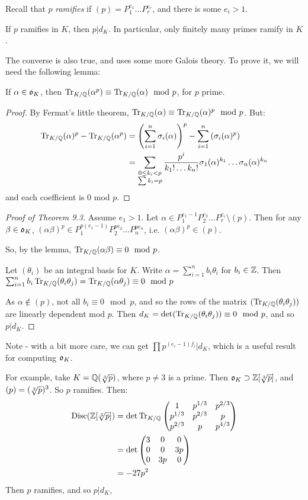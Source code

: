 \documentclass[10pt,a4paper]{article}
\begin{document}
Recall that $p$ \emph{ramifies} if $(p) = P_1^{e_1} \ldots P_r^{e_r}$, and there is some $e_i > 1$.
\begin{theorem}
If $p$ ramifies in $K$, then $p | d_K$. In particular, only finitely many primes ramify in $K$.
\end{theorem}
The converse is also true, and uses some more Galois theory. To prove it, we will need the following lemma:
\begin{lemma}
If $\alpha \in \mathfrak{o}_K$, then $\operatorname{Tr}_{K/\mathbb{Q}}(\alpha^p) \equiv \operatorname{Tr}_{K/\mathbb{Q}}(\alpha)\mod p$, for $p$ prime.
\end{lemma}
\begin{proof}
By Fermat's little theorem, $\operatorname{Tr}_{K/\mathbb{Q}}(\alpha) \equiv \operatorname{Tr}_{K/\mathbb{Q}}(\alpha)^p \mod p$. But:
\begin{align*}
\operatorname{Tr}_{K/\mathbb{Q}}(\alpha)^p - \operatorname{Tr}_{K/\mathbb{Q}}(\alpha^p) &= \left(\sum_{i=1}^n \sigma_i(\alpha)\right)^p - \sum_{i=1}^n \left(\sigma_i(\alpha)^p\right)\\
&= \sum_{\substack{0\leq k_i <p\\\sum k_i = p}} \frac{p^i}{k_1!\ldots k_n!}\sigma_1(\alpha)^{k_1}\ldots \sigma_n(\alpha)^{k_n}
\end{align*}
and each coefficient is $0$ mod $p$.
\end{proof}
\begin{proof}[Proof of Theorem 9.3]
Assume $e_1 > 1$. Let $\alpha \in P_1^{e_1-1}P_2^{e_2}\ldots P_r^{e_r} \setminus (p)$. Then for any $\beta \in \mathfrak{o}_K$, $(\alpha\beta)^p \in P_1^{p(e_1-1)}P_2^{pe_2}\ldots P_n^{pe_n}$, i.e. $(\alpha\beta)^p \in (p)$.

So, by the lemma, $\operatorname{Tr}_{K/\mathbb{Q}}(\alpha\beta) \equiv 0 \mod p$.

Let $(\theta_i)$ be an integral basis for $K$. Write $\alpha = \sum_{i=1}^n b_i \theta_i$ for $b_i \in \mathbb{Z}$. Then $\sum_{i=1}^n b_i \operatorname{Tr}_{K/\mathbb{Q}}(\theta_i\theta_j) = \operatorname{Tr}_{K/\mathbb{Q}}(\alpha \theta_j) \equiv 0 \mod p$

As $\alpha \notin (p)$, not all $b_i \equiv 0 \mod p$, and so the rows of the matrix $(\operatorname{Tr}_{K/\mathbb{Q}}(\theta_i\theta_j))$ are linearly dependent mod $p$. Then $d_K = \det(\operatorname{Tr}_{K/\mathbb{Q}}(\theta_i\theta_j)) \equiv 0 \mod p$, and so $p | d_K$.
\end{proof}
Note - with a bit more care, we can get $\prod p^{(e_i-1)f_i} |d_K$, which is a useful result for computing $\mathfrak{o}_K$.

For example, take $K = \mathbb{Q}(\sqrt[3]{p})$, where $p \neq 3$ is a prime. Then $\mathfrak{o}_K \supset \mathbb{Z}[\sqrt[3]{p}]$, and $(p) = (\sqrt[3]{p})^3$. So $p$ ramifies. Then:
\begin{align*}
\operatorname{Disc}(\mathbb{Z}[\sqrt[3]{p}]) &= \det \operatorname{Tr}_{K/\mathbb{Q}} \begin{pmatrix} 1 & p^{1/3} & p^{2/3} \\ p^{1/3} & p^{2/3} & p \\ p^{2/3} & p & p^{4/3} \end{pmatrix}\\
&= \det \begin{pmatrix}
3 & 0 & 0\\
0 & 0 & 3p\\
0 & 3p & 0
\end{pmatrix}\\
&=-27 p^2
\end{align*}
Then $p$ ramifies, and so $p | d_K$, 
\end{document}

